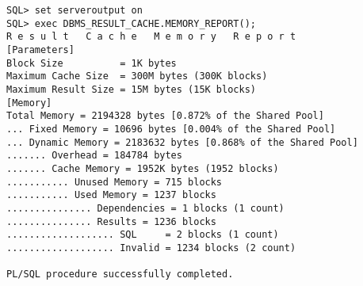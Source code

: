         \begin{lstlisting}[caption={Der Result Cache Report - \identifier{dbms\_result\_cache.memory\_report()}},label=admin707,language=oracle_sql,alsolanguage=sqlplus]
SQL> set serveroutput on
SQL> exec DBMS_RESULT_CACHE.MEMORY_REPORT();
R e s u l t   C a c h e   M e m o r y   R e p o r t
[Parameters]
Block Size          = 1K bytes
Maximum Cache Size  = 300M bytes (300K blocks)
Maximum Result Size = 15M bytes (15K blocks)
[Memory]
Total Memory = 2194328 bytes [0.872% of the Shared Pool]
... Fixed Memory = 10696 bytes [0.004% of the Shared Pool]
... Dynamic Memory = 2183632 bytes [0.868% of the Shared Pool]
....... Overhead = 184784 bytes
....... Cache Memory = 1952K bytes (1952 blocks)
........... Unused Memory = 715 blocks
........... Used Memory = 1237 blocks
............... Dependencies = 1 blocks (1 count)
............... Results = 1236 blocks
................... SQL     = 2 blocks (1 count)
................... Invalid = 1234 blocks (2 count)

PL/SQL procedure successfully completed.
        \end{lstlisting}
